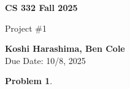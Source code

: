 \documentclass[11pt]{article}
\newtheorem{problem}{Problem}
\begin{document}
\begin{titlepage}
   \begin{center}
       \vspace*{9cm}

       \textbf{CS 332 Fall 2025}

       \vspace{0.5cm}
        Project \#1
        \vfill

       \textbf{Koshi Harashima, Ben Cole}\\
       Due Date: 10/8, 2025
            
   \end{center}
\end{titlepage}

\pagebreak


\begin{problem}
\end{problem}
\end{document}
